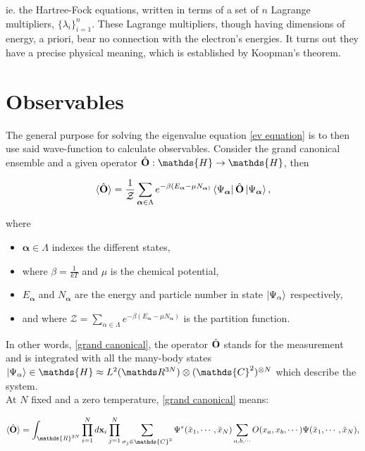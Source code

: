 \documentclass{homework}
\begin{document}
ie. the Hartree-Fock equations, written in terms of a set of $n$ Lagrange multipliers, $\{\lambda_i\}_{i=1}^{n}$. These Lagrange multipliers, though having dimensions of energy, a priori, bear no connection with the electron's energies. It turns out they have a precise physical meaning, which is established by Koopman's theorem.

\clearpage

\section{Observables}

The general purpose for solving the eigenvalue equation \eqref{ev equation} is to then use said wave-function to calculate observables. Consider the grand canonical ensemble and a given operator $\hat{\bf O} : \mathds{H} \rightarrow \mathds{H}$, then 

\begin{equation}
\langle \hat{\bf O} \rangle = \frac{1}{\mathcal{Z}} \sum_{\bm{\alpha }\in \Lambda} e^{-\beta(E_{\bm{\alpha} }- \mu N_{\bm{\alpha})}} \bra{\Psi_{\bm{\alpha}}}\hat{\bf O}\ket{\Psi_{\bm{\alpha}}},
\label{grand canonical}
\end{equation}

where 

\begin{itemize}
    \item $\bm \alpha \in {\Lambda}$ indexes the different states, 
    \item where $\beta = \frac{1}{kT}$ and $\mu$ is the chemical potential,
    \item $E_{\bm{\alpha}}$ and $N_{\bm{\alpha}}$ are the energy and particle number in state $\ket{\Psi_\alpha}$ respectively,
    \item and where $\mathcal{Z} =  \sum_{\alpha \in \Lambda} e^{-\beta(E_{\bm \alpha} - \mu N_{\bm \alpha})}$ is the partition function. 
\end{itemize}

In other words, \eqref{grand canonical}, the operator $\hat{\bf O}$ stands for the measurement and is integrated with all the many-body states $\ket{\Psi_\alpha} \in \mathds{H} \approx L^2(\R^{3N}) \otimes (\mathds{C}^{2})^{\otimes N}$ which describe the system. \\

At $N$ fixed and a zero temperature, \eqref{grand canonical} means:

\begin{equation}
     \langle \hat{\bf O} \rangle = \int_{\mathds{R}^{3N}} \prod_{i=1}^N d{\bf x}_i \prod_{j=1}^{N} \sum_{\sigma_j \in \mathds{C}^2} \Psi^{*}(\tilde{x}_1, \cdots, \tilde{x}_N) \sum_{a,b,\cdots} O(x_a, x_b, \cdots) \Psi(\tilde{x}_1, \cdots, \tilde{x}_N),
\label{ensemble avg}
\end{equation}
\end{document}
